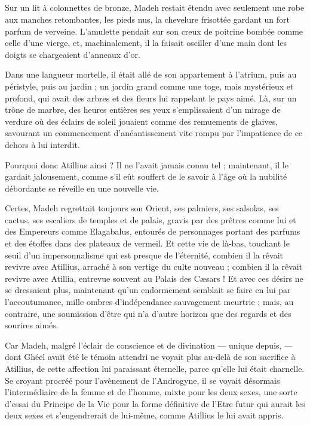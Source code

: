 \documentclass[a4paper, 11pt, oneside, polutonikogreek, french]{article}
\begin{document}
\subsection{}
\paragraph{}
Sur un lit à colonnettes de bronze, Madeh restait étendu avec seulement une robe aux manches retombantes, les pieds nus, la chevelure frisottée gardant un fort parfum de verveine. L'amulette pendait sur son creux de poitrine bombée comme celle d'une vierge, et, machinalement, il la faisait osciller d'une main dont les doigts se chargeaient d'anneaux d'or.

Dans une langueur mortelle, il était allé de son appartement à l'atrium, puis au péristyle, puis au jardin ; un jardin grand comme une toge, mais mystérieux et profond, qui avait des arbres et des fleurs lui rappelant le pays aimé. Là, sur un trône de marbre, des heures entières ses yeux s'emplissaient d'un mirage de verdure où des éclairs de soleil jouaient comme des remuements de glaives, savourant un commencement d'anéantissement vite rompu par l'impatience de ce dehors à lui interdit.

Pourquoi donc Atillius ainsi ? Il ne l'avait jamais connu tel ; maintenant, il le gardait jalousement, comme s'il eût souffert de le savoir à l'âge où la nubilité débordante se réveille en une nouvelle vie.

Certes, Madeh regrettait toujours son Orient, ses palmiers, ses salsolas, ses cactus, ses escaliers de temples et de palais, gravis par des prêtres comme lui et des Empereurs comme Elagabalus, entourés de personnages portant des parfums et des étoffes dans des plateaux de vermeil. Et cette vie de là-bas, touchant le seuil d'un impersonnalisme qui est presque de l'éternité, combien il la rêvait revivre avec Atillius, arraché à son vertige du culte nouveau ; combien il la rêvait revivre avec Atillia, entrevue souvent au Palais des Cæsars ! Et avec ces désirs ne se dressaient plus, maintenant qu'un endormement semblait se faire en lui par l'accoutumance, mille ombres d'indépendance sauvagement meurtrie ; mais, au contraire, une soumission d'être qui n'a d'autre horizon que des regards et des sourires aimés.

Car Madeh, malgré l'éclair de conscience et de divination --- unique depuis, --- dont Ghéel avait été le témoin attendri ne voyait plus au-delà de son sacrifice à Atillius, de cette affection lui paraissant éternelle, parce qu'elle lui était charnelle. Se croyant procréé pour l'avènement de l'Androgyne, il se voyait désormais l'intermédiaire de la femme et de l'homme, mixte pour les deux sexes, une sorte d'essai du Principe de la Vie pour la forme définitive de l'Etre futur qui aurait les deux sexes et s'engendrerait de lui-même, comme Atillius le lui avait appris.
\end{document}

